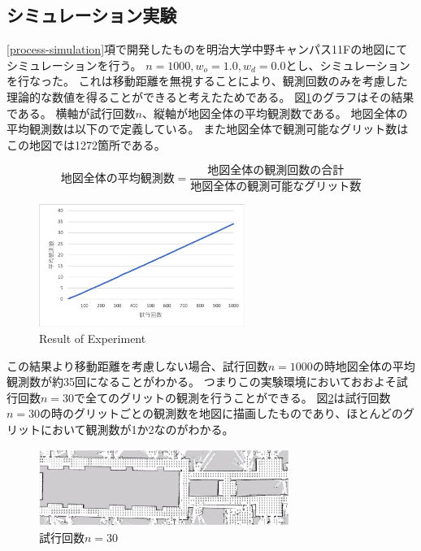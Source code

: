 \documentclass{jsarticle}
\begin{document}
\subsection{シミュレーション実験}
\label{run-simulation}
\ref{process-simulation}項で開発したものを明治大学中野キャンパス11Fの地図にてシミュレーションを行う。
$n=1000,w_o=1.0,w_d=0.0$とし、シミュレーションを行なった。
これは移動距離を無視することにより、観測回数のみを考慮した理論的な数値を得ることができると考えたためである。
図\ref{fig: result of experiments}のグラフはその結果である。
横軸が試行回数$n$、縦軸が地図全体の平均観測数である。
地図全体の平均観測数は以下ので定義している。
また地図全体で観測可能なグリット数はこの地図では1272箇所である。

\begin{equation}
  地図全体の平均観測数 = \frac{地図全体の観測回数の合計}{地図全体の観測可能なグリット数}
	\label{eqn: average-in-map}
\end{equation}

\begin{figure}[tbh]
 \centering
  \includegraphics[height=40mm]{fig/n1000.eps}
  \vspace*{-4mm}
  \caption{Result of Experiment}
  \label{fig: result of experiments}
\end{figure}

この結果より移動距離を考慮しない場合、試行回数$n=1000$の時地図全体の平均観測数が約35回になることがわかる。
つまりこの実験環境においておおよそ試行回数$n=30$で全てのグリットの観測を行うことができる。
図\ref{fig: n30}は試行回数$n=30$の時のグリットごとの観測数を地図に描画したものであり、ほとんどのグリットにおいて観測数が1か2なのがわかる。


\begin{figure}[tbh]
 \centering
  \includegraphics[height=25mm]{fig/n30.eps}
  \vspace*{-4mm}
  \caption{試行回数$n=30$}
  \label{fig: n30}
\end{figure}
\end{document}
